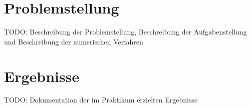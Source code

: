 \documentclass[12pt,a4paper]{scrartcl}
\numberwithin{equation}{section}
\begin{document}



\section{Problemstellung}

TODO: Beschreibung der Problemstellung, Beschreibung der Aufgabenstellung und Beschreibung der numerischen Verfahren


\section{Ergebnisse}

TODO: Dokumentation der im Praktikum erzielten Ergebnisse 
\end{document}
